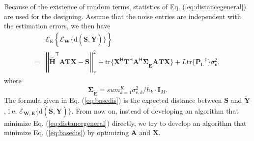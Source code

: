 \documentclass[12pt,draftclsnofoot,onecolumn,journal]{IEEEtran}
\begin{document}
Because of the existence of random terms, statistics of Eq. (\ref{eq:distancegeneral}) are used for the designing. Assume that the noise entries are independent with the estimation errors, we then have
\begin{equation}
\begin{split}
&\mathcal E_{\mathbf E}\left\{\mathcal E_{{\mathbf W}}\{\mathrm d(\mathbf S, \tilde{\mathbf Y})\}\right\}\\
=&\left|\left|\tilde{\hat{\mathbf{H}}}^{\mathsf T}\mathbf{ATX}-\mathbf{S}\right|\right|_{\mathrm{F}}^2+\mathrm{tr}\{\mathbf X^{\mathsf H}\mathbf T^{\mathsf H}\mathbf A^{\mathsf H}
\pmb{\Sigma_{\tilde{\mathbf E}}}\mathbf{ATX}\}+L\mathrm{tr}\{\mathbf P_{\mathrm L}^{-1}\}\sigma_{\mathrm n}^2,
\end{split}
\label{eq:basedis}
\end{equation}
where
\begin{equation}
\pmb{\Sigma_{\tilde{\mathbf E}}}=
sum_{k=1}^K \sigma_{\mathrm e, k}^2/\bar{h}_k\cdot \mathbf{I}_M.
\end{equation}
The formula given in Eq. (\ref{eq:basedis}) is the expected distance between $\mathbf S$ and $\tilde{\mathbf Y}$, i.e. $\mathcal E_{\mathbf W, \mathbf E}\{\mathrm d(\mathbf S, \tilde{\mathbf Y})\}$. From now on, instead of developing an algorithm that minimize Eq. (\ref{eq:distancegeneral}) directly, we try to develop an algorithm that minimize Eq. (\ref{eq:basedis}) by optimizing $\mathbf A$ and $\mathbf X$.
\end{document}
